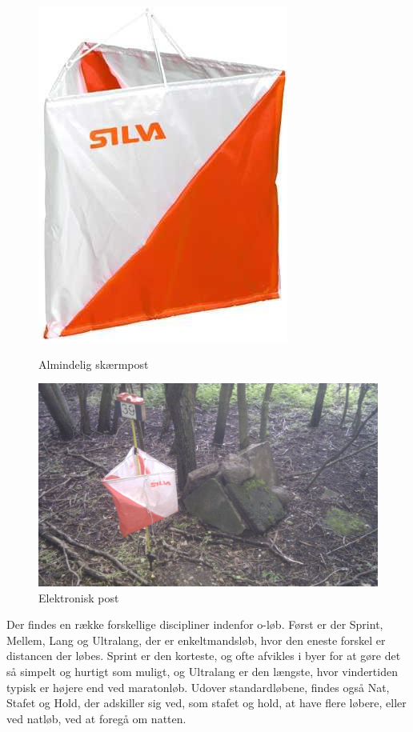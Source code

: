 \begin{figure}
\centering
\begin{minipage}{.5\textwidth}
  \centering
  \includegraphics[width=.5\linewidth]{billeder/o-skaerm}
  \caption{Almindelig skærmpost}
  \label{fig:test1}
\end{minipage}%
\begin{minipage}{.5\textwidth}
  \centering
  \includegraphics[width=1.0\linewidth]{billeder/banelaeggerkreativitet}
  \caption{Elektronisk post}
  \label{fig:test2}
\end{minipage}
\end{figure}

Der findes en række forskellige discipliner indenfor o-løb. Først er der Sprint, Mellem, Lang og  Ultralang, der er enkeltmandsløb, hvor den eneste forskel er distancen der løbes. Sprint er den korteste, og ofte afvikles i byer for at gøre det så simpelt og hurtigt som muligt, og Ultralang er den længste, hvor vindertiden typisk er højere end ved maratonløb. Udover standardløbene, findes også Nat, Stafet og Hold, der adskiller sig ved, som stafet og hold, at have flere løbere, eller ved natløb, ved at foregå om natten. 
